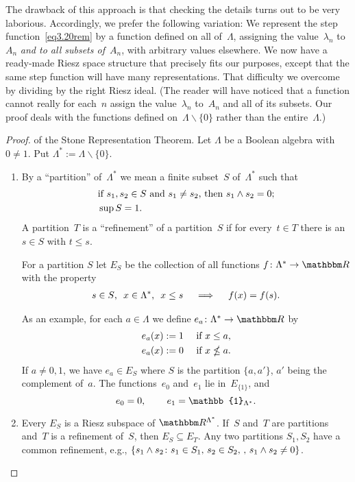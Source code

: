 \documentclass[main.tex]{subfiles}
\begin{document}
The drawback of this approach is that checking the details
turns out to be very laborious.
Accordingly,
we prefer the following variation:
We represent the step function~\eqref{eq3.20rem}
by a function defined on all of~$\Lambda$,
assigning the value~$\lambda_n$ to~$A_n$
\emph{and to all subsets of}~$A_n$,
with arbitrary values elsewhere.
We now have a ready-made Riesz space structure
that precisely fits our purposes,
except that the same step function will have many
representations.
That difficulty we overcome by dividing by
the right Riesz ideal.
(The reader will have noticed that
a function cannot really for each~$n$ assign the value~$\lambda_n$
to~$A_n$ and all of its subsets.
Our proof deals with the functions defined on~$\Lambda\backslash\{0\}$
rather than the entire~$\Lambda$.)
\begin{proof}
of the Stone Representation Theorem.
Let $\Lambda$ be a Boolean algebra with $0\neq 1$.
Put $\Lambda^*:=\Lambda \backslash\{0\}$.
\begin{enumerate}[label=(\Roman*),leftmargin=*]
\item \label{3.20-I}
By a ``partition'' of~$\Lambda^*$
we mean a finite subset~$S$ of~$\Lambda^*$
such that
\begin{alignat*}{2}
& \text{if }s_1,s_2\in S\text{ and }s_1\neq s_2
   \text{, then }s_1\wedge s_2=0\text{;} \\
& \sup S=1\text{.}
\end{alignat*}
A partition~$T$ is a ``refinement'' of a partition~$S$
if for every~$t\in T$ there is an~$s\in S$ with $t\leq s$.

For a partition $S$ let $E_S$ be the collection
of all functions $f\colon \Lambda^* \ra \R$ with the property
\begin{align*}
s\in S\text{, }\ x\in\Lambda^*\text{, }\ x\leq s
\quad \implies \quad f(x)=f(s)\text{.}
\end{align*}

As an example,
for each $a\in\Lambda$ 
we define $e_a\colon \Lambda^* \ra \R$ by
\begin{alignat*}{2}
e_a(x) := 1 \quad & \text{ if } x\leq a\text{,} \\
e_a(x) := 0 \quad & \text{ if } x\nleq a\text{.}
\end{alignat*}
If $a\neq0,1$, we have $e_a\in E_S$ 
where $S$ is the partition $\{a, a'\}$,
$a'$ being the complement of~$a$.
The functions~$e_0$ and~$e_1$ lie in~$E_{\{1\}}$,
and
\begin{equation*}
e_0 = 0\htam{, } \qquad e_1 = \mathbb{1}_{\Lambda^*}\htam{.}
\end{equation*}
%
\item \label{3.20-II}
Every $E_S$ is a Riesz subspace of $\R^{\Lambda^*}$.
If~$S$ and~$T$ are partitions
and~$T$ is a refinement of~$S$,
then $E_S\subseteq E_T$.
Any two partitions $S_1,S_2$ 
have a common refinement,
e.g., $\{ s_1 \wedge s_2\colon s_1\in S_1\text{, }s_2\in S_2\text{, }\text{, }
  s_1 \wedge s_2 \neq 0\}$.


\end{enumerate}
\end{proof}
\end{document}
